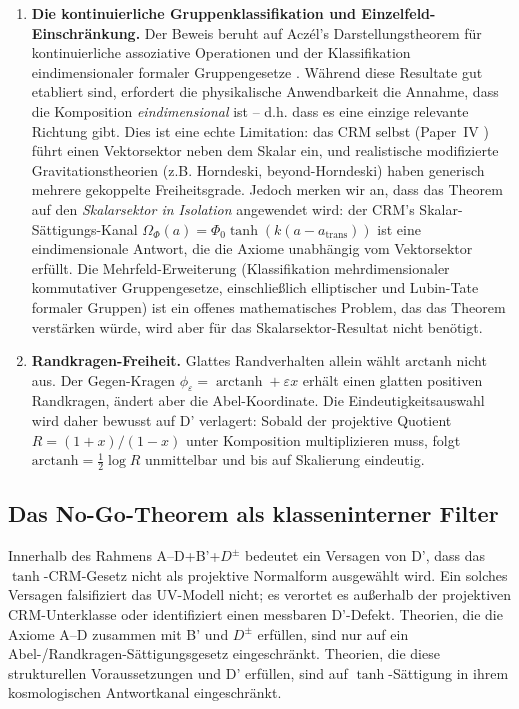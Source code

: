 \documentclass[aps,prd,twocolumn,superscriptaddress,nofootinbib]{revtex4-2}
\begin{document}
\begin{enumerate}
\item \textbf{Die kontinuierliche Gruppenklassifikation und Einzelfeld-Einschränkung.} Der Beweis beruht auf Aczél's Darstellungstheorem für kontinuierliche assoziative Operationen \cite{Aczel1966} und der Klassifikation eindimensionaler formaler Gruppengesetze \cite{Hazewinkel1978}. Während diese Resultate gut etabliert sind, erfordert die physikalische Anwendbarkeit die Annahme, dass die Komposition \textit{eindimensional} ist -- d.h. dass es eine einzige relevante Richtung gibt. Dies ist eine echte Limitation: das CRM selbst (Paper~IV \cite{Geiger2026d}) führt einen Vektorsektor neben dem Skalar ein, und realistische modifizierte Gravitationstheorien (z.B. Horndeski, beyond-Horndeski) haben generisch mehrere gekoppelte Freiheitsgrade. Jedoch merken wir an, dass das Theorem auf den \textit{Skalarsektor in Isolation} angewendet wird: der CRM's Skalar-Sättigungs-Kanal $\Omega_\Phi(a) = \Phi_0 \tanh(k(a - a_{\mathrm{trans}}))$ ist eine eindimensionale Antwort, die die Axiome unabhängig vom Vektorsektor erfüllt. Die Mehrfeld-Erweiterung (Klassifikation mehrdimensionaler kommutativer Gruppengesetze, einschließlich elliptischer und Lubin-Tate formaler Gruppen) ist ein offenes mathematisches Problem, das das Theorem verstärken würde, wird aber für das Skalarsektor-Resultat nicht benötigt.

\item \textbf{Randkragen-Freiheit.} Glattes Randverhalten allein wählt $\mathrm{arctanh}$ nicht aus. Der Gegen-Kragen $\phi_\varepsilon=\operatorname{arctanh}+\varepsilon x$ erhält einen glatten positiven Randkragen, ändert aber die Abel-Koordinate. Die Eindeutigkeitsauswahl wird daher bewusst auf D' verlagert: Sobald der projektive Quotient $R=(1+x)/(1-x)$ unter Komposition multiplizieren muss, folgt $\mathrm{arctanh}=\frac12\log R$ unmittelbar und bis auf Skalierung eindeutig.
\end{enumerate}

\subsection{Das No-Go-Theorem als klasseninterner Filter}

Innerhalb des Rahmens A--D+B'+$D^\pm$ bedeutet ein Versagen von D', dass das $\tanh$-CRM-Gesetz nicht als projektive Normalform ausgewählt wird. Ein solches Versagen falsifiziert das UV-Modell nicht; es verortet es außerhalb der projektiven CRM-Unterklasse oder identifiziert einen messbaren D'-Defekt. Theorien, die die Axiome A--D zusammen mit B' und $D^\pm$ erfüllen, sind nur auf ein Abel-/Randkragen-Sättigungsgesetz eingeschränkt. Theorien, die diese strukturellen Voraussetzungen und D' erfüllen, sind auf $\tanh$-Sättigung in ihrem kosmologischen Antwortkanal eingeschränkt.
\end{document}
